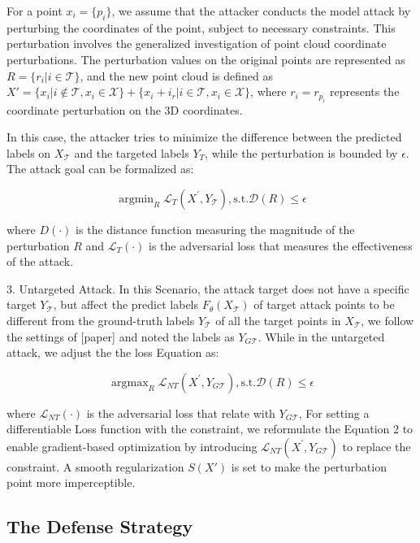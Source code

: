 \documentclass[conference]{IEEEtran}
\begin{document}
For a point $x_i=\{p_i\}$, we assume that the attacker conducts the model attack by perturbing the coordinates of the point, subject to necessary constraints. This perturbation involves the generalized investigation of point cloud coordinate perturbations. The perturbation values on the original points are represented as $R=\{r_i|i\in \mathcal{T}\}$, and the new point cloud is defined as $X'=\{x_i|i\notin \mathcal{T},x_i\in \mathcal{X}\}+\{x_i+i_r|i\in \mathcal{T},x_i\in \mathcal{X}\}$, where $r_i=r_{p_i}$ represents the coordinate perturbation on the 3D coordinates.

In this case, the attacker tries to minimize the difference between the predicted labels on $X_\mathcal{T}$ and the targeted labels $Y_T$, while the perturbation is bounded by $\epsilon $. The attack goal can be formalized as:

\begin{equation}
\mathop{\mathrm{argmin}}_{R}\mathcal{L}_{T}(X^{\prime},Y_{\mathcal{T}}),\mathrm{s.t.}\mathcal{D}(R)\leq\epsilon    
\end{equation}


where $D(\cdot)$ is the distance function measuring the magnitude of the perturbation $R$ and $\mathcal{L}_T(\cdot)$ is the adversarial loss that measures the effectiveness of the attack. 

$3$. Untargeted Attack. In this Scenario,  the attack target does not have a specific target $Y_\mathcal{T}$, but affect the predict labels  $F_{\theta}(X_\mathcal{T})$ of target attack points to be different from the ground-truth labels $Y_\mathcal{T}$ of  all the target points in $X_\mathcal{T}$, we follow the settings of [paper] and noted the labels as $Y_{G\mathcal{T}}$. While in the untargeted attack, we adjust the the loss Equation as:

\begin{equation}
\mathop{\mathrm{argmax}}_{R}\mathcal{L}_{NT}(X^{\prime},Y_{G\mathcal{T}}),\mathrm{s.t.}\mathcal{D}(R)\leq\epsilon    
\end{equation}

where $\mathcal{L}_{NT}(\cdot)$ is the adversarial loss that relate with $Y_{G\mathcal{T}}$, For setting a differentiable Loss function with the constraint, we reformulate the Equation 2 to enable gradient-based optimization by introducing $\mathcal{L}_{NT}(X^{\prime},Y_{G\mathcal{T}})$ to replace the constraint. A smooth regularization $S(X')$ is set to make the perturbation point more imperceptible.


\subsection{The Defense Strategy}
\end{document}
